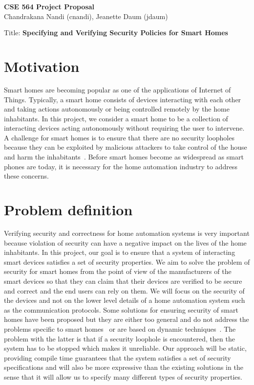 \documentclass{article}
\begin{document}
\begin{center}
\LARGE\textbf {CSE 564 Project Proposal}\\
\large Chandrakana Nandi (cnandi), Jeanette Daum (jdaum)
\end{center}
\begin{center}
\large Title: \textbf{Specifying and Verifying Security Policies for Smart Homes}
\end{center}

\section{Motivation}
Smart homes are becoming popular as one of the applications of Internet of Things. Typically, a smart home consists of devices interacting with each other and taking actions autonomously or being controlled remotely by the home inhabitants. In this project, we consider a smart home to be a collection of interacting devices acting autonomously without requiring the user to intervene. A challenge for smart homes is to ensure that there are no security loopholes because they can be exploited by malicious attackers to take control of the house and harm the inhabitants~\cite{yoshi, jung}. Before smart homes become as widespread as smart phones are today, it is necessary for the home automation industry to address these concerns.

\section{Problem definition}
Verifying security and correctness for home automation systems is very important because violation of security can have a negative impact on the lives of the home inhabitants. In this project, our goal is to ensure that a system of interacting smart devices satisfies a set of security properties. We aim to solve the problem of security for smart homes from the point of view of the manufacturers of the smart devices so that they can claim that their devices are verified to be secure and correct and the end users can rely on them. 
We will focus on the security of the devices and not on the lower level details of a home automation system such as the communication protocols. Some solutions for ensuring security of smart homes have been proposed but they are either too general and do not address the problems specific to smart homes~\cite{semantec} or are based on dynamic techniques~\cite{al2000secure}. The problem with the latter is that if a security loophole is encountered, then the system has to be stopped which makes it unreliable. Our approach will be static, providing compile time guarantees that the system satisfies a set of security specifications and will also be more expressive than the existing solutions in the sense that it will allow us to specify many different types of security properties.   
\end{document}
